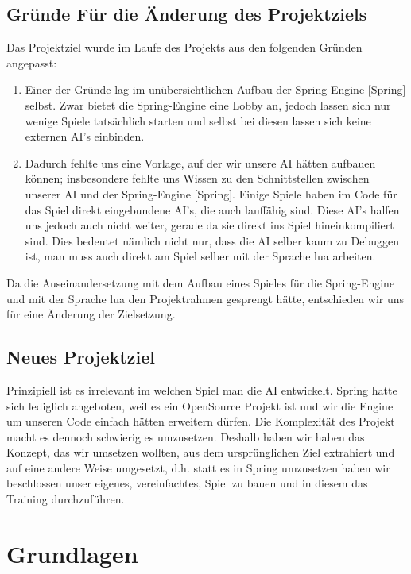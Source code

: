 \documentclass[
	12pt,
	a4paper,
	BCOR10mm,
	DIV14,
	headsepline,
	usegeometry,
]{scrreprt}
\begin{document}
\section{Gründe Für die Änderung des Projektziels}

Das Projektziel wurde im Laufe des Projekts aus den folgenden Gründen angepasst:
\begin{enumerate}
	\item Einer der Gründe lag im unübersichtlichen Aufbau der Spring-Engine [Spring] selbst. 
		Zwar bietet die Spring-Engine eine Lobby an, jedoch lassen sich nur wenige Spiele tatsächlich starten und selbst bei diesen lassen sich keine externen AI's einbinden. 

	\item	Dadurch fehlte uns eine Vorlage, auf der wir unsere AI hätten aufbauen können; insbesondere fehlte uns Wissen zu den Schnittstellen zwischen unserer AI und der Spring-Engine [Spring].
		Einige Spiele haben im Code für das Spiel direkt eingebundene AI's, die auch lauffähig sind. 
		Diese AI's halfen uns jedoch auch nicht weiter, gerade da sie direkt ins Spiel hineinkompiliert sind. 
		Dies bedeutet nämlich nicht nur, dass die AI selber kaum zu Debuggen ist, man muss auch direkt am Spiel selber mit der Sprache lua arbeiten. 
\end{enumerate}

Da die Auseinandersetzung mit dem Aufbau eines Spieles für die Spring-Engine und mit der Sprache lua den Projektrahmen gesprengt hätte, entschieden wir uns für eine Änderung der Zielsetzung.

\section{Neues Projektziel}
Prinzipiell ist es irrelevant im welchen Spiel man die AI entwickelt. Spring hatte sich lediglich angeboten, weil es ein OpenSource Projekt ist und wir die Engine um unseren Code einfach hätten erweitern dürfen.
Die Komplexität des Projekt macht es dennoch schwierig es umzusetzen.
Deshalb haben wir haben das Konzept, das wir umsetzen wollten, aus dem ursprünglichen Ziel extrahiert und auf eine andere Weise umgesetzt, d.h. statt es in Spring umzusetzen haben wir beschlossen unser eigenes, vereinfachtes, Spiel zu bauen und in diesem das Training durchzuführen.


\chapter{Grundlagen}
\label{basics}
\end{document}
